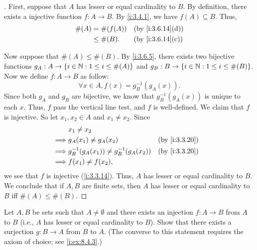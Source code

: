 \begin{proof}[]
  First, suppose that \(A\) has lesser or equal cardinality to \(B\).
  By definition, there exists a injective function \(f : A \to B\).
  By \cref{i:3.4.1}, we have \(f(A) \subseteq B\).
  Thus,
  \begin{align*}
    \#(A) & = \#(f(A))  &  & \by{i:3.6.14}[d] \\
          & \leq \#(B). &  & \by{i:3.6.14}[c]
  \end{align*}

  Now suppose that \(\#(A) \leq \#(B)\).
  By \cref{i:3.6.5}, there exists two bijective functions \(g_A : A \to \left\lbrace i \in \mathbb{N} : 1 \leq i \leq \#(A)\right\rbrace\) and \(g_B : B \to \left\lbrace i \in \mathbb{N} : 1 \leq i \leq \#(B)\right\rbrace\).
  Now we define \(f : A \to B\) as follow:
  \[
    \forall x \in A, f(x) = g_B^{-1}(g_A(x)).
  \]
  Since both \(g_A\) and \(g_B\) are bijective, we know that \(g_B^{-1}(g_A(x))\) is unique to each \(x\).
  Thus, \(f\) pass the vertical line test, and \(f\) is well-defined.
  We claim that \(f\) is injective.
  So let \(x_1, x_2 \in A\) and \(x_1 \neq x_2\).
  Since
  \begin{align*}
             & x_1 \neq x_2                                                  \\
    \implies & g_A(x_1) \neq g_A(x_2)                     &  & \by{i:3.3.20} \\
    \implies & g_B^{-1}(g_A(x_1)) \neq g_B^{-1}(g_A(x_2)) &  & \by{i:3.3.20} \\
    \implies & f(x_1) \neq f(x_2),
  \end{align*}
  we see that \(f\) is injective (\cref{i:3.3.14}).
  Thus, \(A\) has lesser or equal cardinality to \(B\).
  We conclude that if \(A, B\) are finite sets, then \(A\) has lesser or equal cardinality to \(B\) iff \(\#(A) \leq \#(B)\).
\end{proof}

\begin{ex}\label{i:ex:3.6.8}
  Let \(A, B\) be sets such that \(A \neq \emptyset\) and there exists an injection \(f : A \to B\) from \(A\) to \(B\) (i.e., \(A\) has lesser or equal cardinality to \(B\)).
  Show that there exists a surjection \(g : B \to A\) from \(B\) to \(A\).
  (The converse to this statement requires the axiom of choice;
  see \cref{i:ex:8.4.3}.)
\end{ex}

